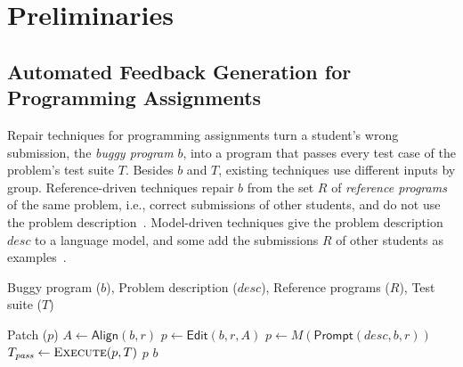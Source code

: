 \documentclass[conference]{IEEEtran}
\begin{document}
\section{Preliminaries}
\label{sec:preliminaries}

\subsection{Automated Feedback Generation for Programming Assignments}
\label{sec:formulation}

Repair techniques for programming assignments turn a student's wrong submission, the \emph{buggy program} \(b\), into a program that passes every test case of the problem's test suite \(T\). Besides \(b\) and \(T\), existing techniques use different inputs by group. Reference-driven techniques repair \(b\) from the set \(R\) of \emph{reference programs} of the same problem, i.e., correct submissions of other students, and do not use the problem description~\cite{gulwani2018automated,wang2018search,hu2019re,choi2025automated}. Model-driven techniques give the problem description \(\mathit{desc}\) to a language model, and some add the submissions \(R\) of other students as examples~\cite{heo2023referent,zhao2026peer,dai2026learner}.

\begin{algorithm}[h]
\caption{Generic repair procedure}
\label{alg:generic}
\footnotesize
\begin{algorithmic}[1]
\item[\textbf{Input:}] Buggy program ($b$), Problem description ($\mathit{desc}$), Reference programs ($R$), Test suite ($T$)
\item[\textbf{Output:}] Patch ($p$)
 
  \State $A\gets\mathsf{Align}(b,r)$ 
  \State $p\gets\mathsf{Edit}(b,r,A)$ 
 \Else {}
  \State $p\gets M(\mathsf{Prompt}(\mathit{desc},b,r))$
 \EndIf
 \State $T_{\mathit{pass}}\gets\textsc{Execute}(p,T)$
  \State \Return $p$ \EndIf
\EndFor
\State \Return $b$
\EndProcedure
\end{algorithmic}
\end{algorithm}
\end{document}
